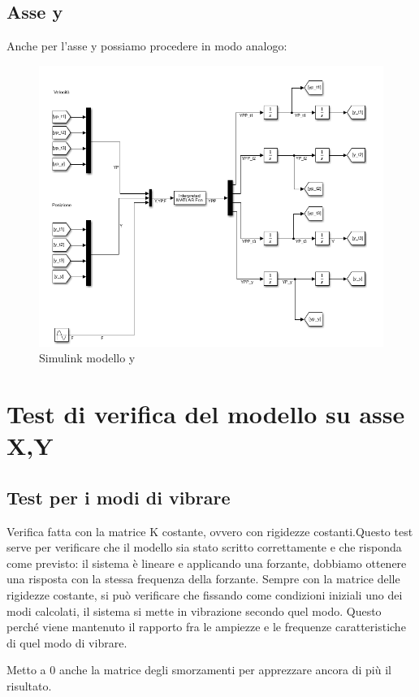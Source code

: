 \documentclass{article}
\begin{document}
\subsection{Asse y}
Anche per l'asse y possiamo procedere in modo analogo:
\begin{figure}[H]
\centering
\includegraphics[width=.8\textwidth]{./simulink/assey/modelloy.png}
\caption{ Simulink modello y}
\end{figure}
\section{Test di verifica del modello su asse X,Y}

\subsection{Test per i modi di vibrare}
Verifica fatta con la matrice K costante, ovvero con rigidezze costanti.Questo test serve per verificare che il modello sia stato scritto correttamente
e che risponda come previsto:
il sistema è lineare e applicando una forzante, dobbiamo ottenere una risposta con la stessa frequenza della forzante.
Sempre con la matrice delle rigidezze costante, si può verificare che fissando come condizioni iniziali uno dei modi calcolati, il sistema si mette in vibrazione secondo quel modo.
Questo perché viene mantenuto il rapporto fra le ampiezze e le frequenze caratteristiche di quel modo di vibrare.

Metto a 0 anche la matrice degli smorzamenti per apprezzare ancora di più il risultato.
\end{document}

